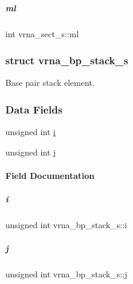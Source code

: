 \mbox{\label{group__data__structures_a25b6b41468a46ee9ce5115109d70a1c2}} 
\subparagraph{\texorpdfstring{ml}{ml}}
{\footnotesize\ttfamily int vrna\+\_\+sect\+\_\+s\+::ml}

\label{structvrna__bp__stack__s}
\subsubsection{struct vrna\+\_\+bp\+\_\+stack\+\_\+s}
Base pair stack element. \subsubsection*{Data Fields}
\begin{DoxyCompactItemize}
\item 
unsigned int \mbox{\hyperlink{group__data__structures_a34d7d05bb7cc48d60823a8cc50a3959f}{i}}
\item 
unsigned int \mbox{\hyperlink{group__data__structures_a95abd1d1b08d6d242c77bc069782e8c9}{j}}
\end{DoxyCompactItemize}


\paragraph{Field Documentation}
\mbox{\label{group__data__structures_a34d7d05bb7cc48d60823a8cc50a3959f}} 
\subparagraph{\texorpdfstring{i}{i}}
{\footnotesize\ttfamily unsigned int vrna\+\_\+bp\+\_\+stack\+\_\+s\+::i}

\mbox{\label{group__data__structures_a95abd1d1b08d6d242c77bc069782e8c9}} 
\subparagraph{\texorpdfstring{j}{j}}
{\footnotesize\ttfamily unsigned int vrna\+\_\+bp\+\_\+stack\+\_\+s\+::j}

\label{structpu__contrib}
